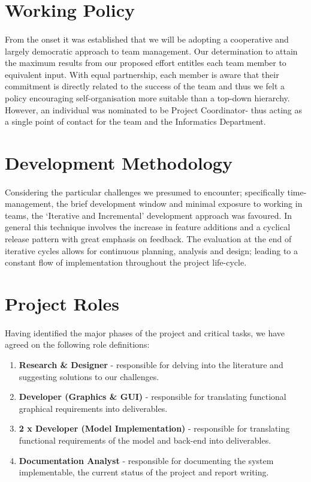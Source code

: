 \documentclass[11pt,a4paper]{article}
\begin{document}
\section{Working Policy}
\paragraph{}
From the onset it was established that we will be adopting a cooperative and largely democratic approach to team management.  Our determination to attain the maximum results from our proposed effort entitles each team member to equivalent input.  With equal partnership, each member is aware that their commitment is directly related to the success of the team and thus we felt a policy encouraging self-organisation more suitable than a top-down hierarchy.  However, an individual was nominated to be Project Coordinator- thus acting as a single point of contact for the team and the Informatics Department.

\section{Development Methodology}
\paragraph{}
Considering the particular challenges we presumed to encounter; specifically time-management, the brief development window and minimal exposure to working in teams, the ‘Iterative and Incremental’ development approach was favoured.  In general this technique involves the increase in feature additions and a cyclical release pattern with great emphasis on feedback.  The evaluation at the end of iterative cycles allows for continuous planning, analysis and design; leading to a constant flow of implementation throughout the project life-cycle.

\section{Project Roles}
\paragraph{}
Having identified the major phases of the project and critical tasks, we have agreed on the following role definitions:

\begin{enumerate}[itemsep=-1ex]
  \item \textbf{Research \& Designer} - responsible for delving into the literature and suggesting solutions to our challenges.
  \item \textbf{Developer (Graphics \& GUI)} - responsible for translating functional graphical requirements into deliverables.
  \item \textbf{2 x Developer (Model Implementation)} - responsible for translating functional requirements of the model and back-end into deliverables.
  \item \textbf{Documentation Analyst} - responsible for documenting the system implementable, the current status of the project and report writing.
\end{enumerate}
\end{document}
